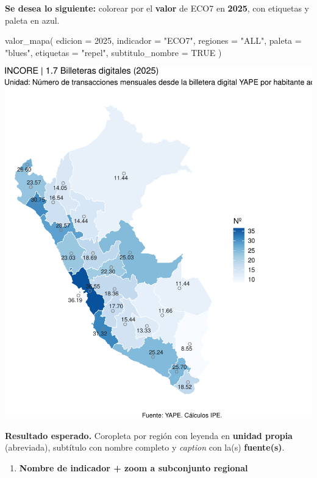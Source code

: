 \documentclass[
  11pt,
  letterpaper,
  DIV=11,
  numbers=noendperiod]{scrartcl}
\newenvironment{Shaded}{\begin{snugshade}}{\end{snugshade}}
\newcommand{\AttributeTok}[1]{\textcolor[rgb]{0.40,0.45,0.13}{#1}}
\newcommand{\ConstantTok}[1]{\textcolor[rgb]{0.56,0.35,0.01}{#1}}
\newcommand{\DecValTok}[1]{\textcolor[rgb]{0.68,0.00,0.00}{#1}}
\newcommand{\FunctionTok}[1]{\textcolor[rgb]{0.28,0.35,0.67}{#1}}
\newcommand{\NormalTok}[1]{\textcolor[rgb]{0.00,0.23,0.31}{#1}}
\newcommand{\StringTok}[1]{\textcolor[rgb]{0.13,0.47,0.30}{#1}}
\providecommand{\tightlist}{%
  \setlength{\itemsep}{0pt}\setlength{\parskip}{0pt}}\usepackage{longtable,booktabs,array}
\begin{document}
\textbf{Se desea lo siguiente:} colorear por el \textbf{valor} de ECO7
en \textbf{2025}, con etiquetas y paleta en azul.

\begin{Shaded}
\begin{Highlighting}[]
\FunctionTok{valor\_mapa}\NormalTok{(}
  \AttributeTok{edicion          =} \DecValTok{2025}\NormalTok{,}
  \AttributeTok{indicador        =} \StringTok{"ECO7"}\NormalTok{,}
  \AttributeTok{regiones         =} \StringTok{"ALL"}\NormalTok{,}
  \AttributeTok{paleta           =} \StringTok{"blues"}\NormalTok{,}
  \AttributeTok{etiquetas        =} \StringTok{"repel"}\NormalTok{,}
  \AttributeTok{subtitulo\_nombre =} \ConstantTok{TRUE}
\NormalTok{)}
\end{Highlighting}
\end{Shaded}

\includegraphics{Manual_files/figure-pdf/unnamed-chunk-84-1.pdf}

\textbf{Resultado esperado.} Coropleta por región con leyenda en
\textbf{unidad propia} (abreviada), subtítulo con nombre completo y
\emph{caption} con la(s) \textbf{fuente(s)}.

\begin{enumerate}
\def\labelenumi{\arabic{enumi}.}
\setcounter{enumi}{1}
\tightlist
\item
  \textbf{Nombre de indicador + zoom a subconjunto regional}
\end{enumerate}
\end{document}
